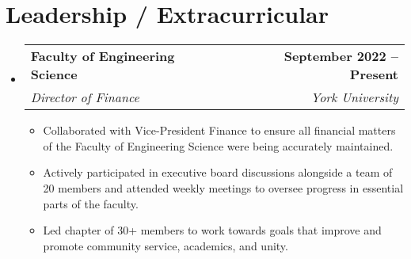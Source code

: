 \documentclass[letterpaper,11pt]{article}
\makeatletter
\newcommand{\resumeItem}[1]{
  \item\small{
    {#1 \vspace{-2pt}}
  }
}
\newcommand{\resumeSubheading}[4]{
  \vspace{-2pt}\item
    \begin{tabular*}{1.0\textwidth}[t]{l@{\extracolsep{\fill}}r}
      \textbf{#1} & \textbf{\small #2} \\
      \textit{\small#3} & \textit{\small #4} \\
    \end{tabular*}\vspace{-7pt}
}
\newcommand{\resumeSubHeadingListStart}{\begin{itemize}[leftmargin=0.0in, label={}]}
\newcommand{\resumeSubHeadingListEnd}{\end{itemize}}
\newcommand{\resumeItemListStart}{\begin{itemize}}
\newcommand{\resumeItemListEnd}{\end{itemize}\vspace{-5pt}}
\makeatother
\begin{document}
\section{Leadership / Extracurricular}
    \resumeSubHeadingListStart
        \resumeSubheading{Faculty of Engineering Science}{September 2022 -- Present}{Director of Finance}{York University}
            \resumeItemListStart
                \resumeItem{Collaborated with Vice-President Finance to ensure all financial matters of the Faculty of Engineering Science were being accurately maintained.}
                \resumeItem{ Actively participated in executive board discussions alongside a team of 20 members and attended weekly meetings to oversee progress in essential parts of the faculty.}
                \resumeItem{Led chapter of 30+ members to work towards goals that improve and promote community service, academics, and unity.}
            \resumeItemListEnd
        
    \resumeSubHeadingListEnd
\end{document}
